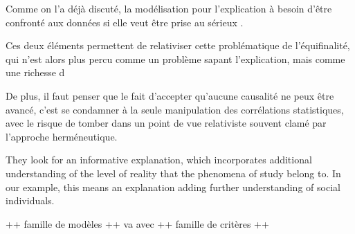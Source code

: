 Comme on l'a déjà discuté, la modélisation pour l'explication à besoin d'être confronté aux données si elle veut être prise au sérieux \autocite{Banos2013}.






Ces deux éléments permettent de relativiser cette problématique de l'équifinalité, qui n'est alors plus percu comme un problème sapant l'explication, mais comme une richesse d






De plus, il faut penser que le fait d'accepter qu'aucune causalité ne peux être avancé, c'est se condamner à la seule manipulation des corrélations statistiques, avec le risque de tomber dans un point de vue relativiste souvent clamé par l'approche herméneutique.






They look for an informative explanation, which incorporates additional understanding of the level of reality that the phenomena of study belong to. In our example, this means an explanation adding further understanding of social individuals.


































++ famille de modèles ++ va avec
++ famille de critères ++ 



 

